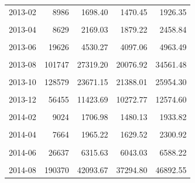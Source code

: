 \begin{longtable}[t]{crrrr}
2013-02 & 8986 & 1698.40 & 1470.45 & 1926.35\\
\cellcolor{gray!10}{2013-03} & \cellcolor{gray!10}{10144} & \cellcolor{gray!10}{2484.37} & \cellcolor{gray!10}{2161.52} & \cellcolor{gray!10}{2807.23}\\
2013-04 & 8629 & 2169.03 & 1879.22 & 2458.84\\
\cellcolor{gray!10}{2013-05} & \cellcolor{gray!10}{12212} & \cellcolor{gray!10}{2960.53} & \cellcolor{gray!10}{2587.03} & \cellcolor{gray!10}{3334.02}\\
2013-06 & 19626 & 4530.27 & 4097.06 & 4963.49\\
\cellcolor{gray!10}{2013-07} & \cellcolor{gray!10}{39124} & \cellcolor{gray!10}{12182.81} & \cellcolor{gray!10}{8905.05} & \cellcolor{gray!10}{15460.57}\\
2013-08 & 101747 & 27319.20 & 20076.92 & 34561.48\\
\cellcolor{gray!10}{2013-09} & \cellcolor{gray!10}{188981} & \cellcolor{gray!10}{36616.85} & \cellcolor{gray!10}{32173.16} & \cellcolor{gray!10}{41060.55}\\
2013-10 & 128579 & 23671.15 & 21388.01 & 25954.30\\
\cellcolor{gray!10}{2013-11} & \cellcolor{gray!10}{59846} & \cellcolor{gray!10}{14269.15} & \cellcolor{gray!10}{11710.48} & \cellcolor{gray!10}{16827.81}\\
2013-12 & 56455 & 11423.69 & 10272.77 & 12574.60\\
\cellcolor{gray!10}{2014-01} & \cellcolor{gray!10}{19362} & \cellcolor{gray!10}{3539.37} & \cellcolor{gray!10}{3130.36} & \cellcolor{gray!10}{3948.37}\\
2014-02 & 9024 & 1706.98 & 1480.13 & 1933.82\\
\cellcolor{gray!10}{2014-03} & \cellcolor{gray!10}{8386} & \cellcolor{gray!10}{2050.56} & \cellcolor{gray!10}{1666.85} & \cellcolor{gray!10}{2434.28}\\
2014-04 & 7664 & 1965.22 & 1629.52 & 2300.92\\
\cellcolor{gray!10}{2014-05} & \cellcolor{gray!10}{12084} & \cellcolor{gray!10}{2926.95} & \cellcolor{gray!10}{2548.61} & \cellcolor{gray!10}{3305.29}\\
2014-06 & 26637 & 6315.63 & 6043.03 & 6588.22\\
\cellcolor{gray!10}{2014-07} & \cellcolor{gray!10}{50435} & \cellcolor{gray!10}{13428.51} & \cellcolor{gray!10}{11082.71} & \cellcolor{gray!10}{15774.30}\\
2014-08 & 190370 & 42093.67 & 37294.80 & 46892.55\\

\end{longtable}

